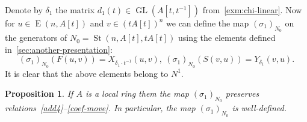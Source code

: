 \documentclass[oneside, 10pt]{amsart}
\DeclareMathOperator{\St}{St}
\DeclareMathOperator{\E}{E}
\DeclareMathOperator{\GL}{GL}
\numberwithin{equation}{section}
\numberwithin{lemma}{section}
\newtheorem{prop}[lemma]{Proposition}
\theoremstyle{definition}
\theoremstyle{remark}
\begin{document}

Denote by $\delta_1$ the matrix $d_1(t) \in \GL(A[t, t^{-1}])$ from~\cref{exm:chi-linear}.
Now for $u \in \E(n, A[t])$ and $v \in (tA[t])^n$ we can define the map $(\sigma_1)_{N_0}$ on the generators of $N_{0}=\St(n, A[t], tA[t])$ 
 using the elements defined in~\cref{sec:another-presentation}:
\begin{equation*}
 (\sigma_1)_{N_0} (F(u, v)) = X_{\delta_1 \cdot t^{-1}}(u, v),\ (\sigma_1)_{N_0} (S(v, u)) = Y_{\delta_1}(v, u).
\end{equation*}
It is clear that the above elements belong to $N^1$.

\begin{prop}
 If $A$ is a local ring them the map $(\sigma_1)_{N_0}$ preserves relations~\eqref{add4}--\eqref{coef-move}.
 In particular, the map $(\sigma_1)_{N_0}$ is well-defined.
\end{prop} 
\end{document}
